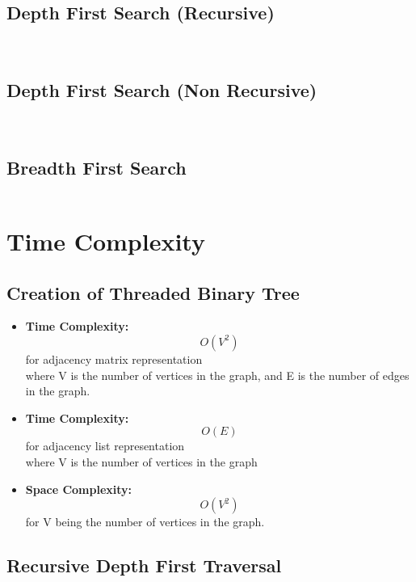 \documentclass[11pt]{article}
\begin{document}
\subsection{Depth First Search (Recursive)}
\begin{lstlisting}[language=C++]
    
\end{lstlisting}

\subsection{Depth First Search (Non Recursive)}
\begin{lstlisting}[language=C++]
    
\end{lstlisting}

\subsection{Breadth First Search}
\begin{lstlisting}[language=C++]
\end{lstlisting}

\section{Time Complexity}

\subsection{Creation of Threaded Binary Tree}
\begin{itemize}
    \item \textbf{Time Complexity:} \[O(V^2)\] for adjacency matrix representation\\
    where V is the number of vertices in the graph, and E is the number of edges in the graph.
    \item \textbf{Time Complexity:} \[O(E)\] for adjacency list representation\\
    where V is the number of vertices in the graph
    \item \textbf{Space Complexity:} \[O(V^2)\] for V being the number of vertices in the graph.
\end{itemize}

\subsection{Recursive Depth First Traversal}
\end{document}
